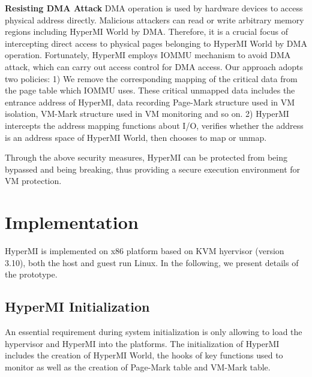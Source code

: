\documentclass[conference]{IEEEtran}
\begin{document}
\textbf{Resisting DMA Attack}
DMA operation is used by hardware devices to access physical address directly. Malicious attackers can read or write arbitrary memory regions including HyperMI World by DMA. Therefore, it is a crucial focus of intercepting direct access to physical pages belonging to HyperMI World by DMA operation. 
Fortunately, HyperMI employs IOMMU mechanism to avoid DMA attack, which can carry out access control for DMA access. Our approach adopts two policies: 1) We remove the corresponding mapping of the critical data from the page table which IOMMU uses. These critical unmapped data includes the entrance address of HyperMI, data recording Page-Mark structure used in VM isolation, VM-Mark structure used in VM monitoring and so on. 2) HyperMI intercepts the address mapping functions about I/O, verifies whether the address is an address space of HyperMI World, then chooses to map or unmap.


Through the above security measures, HyperMI can be protected from being bypassed and being breaking, thus providing a secure execution environment for VM protection.




















\iffalse
\section{Implementation}\label{sec:imp}

HyperMI is implemented on x86 platform based on KVM hyervisor (version 3.10), both the host and guest run Linux. In the following, we present details of the prototype. 

\subsection {HyperMI Initialization}
An essential requirement during system initialization is only allowing to load the hypervisor and HyperMI into the platforms.
The initialization of HyperMI includes the creation of HyperMI World, the hooks of key functions used to monitor as well as the creation of Page-Mark table and VM-Mark table. 
\end{document}
